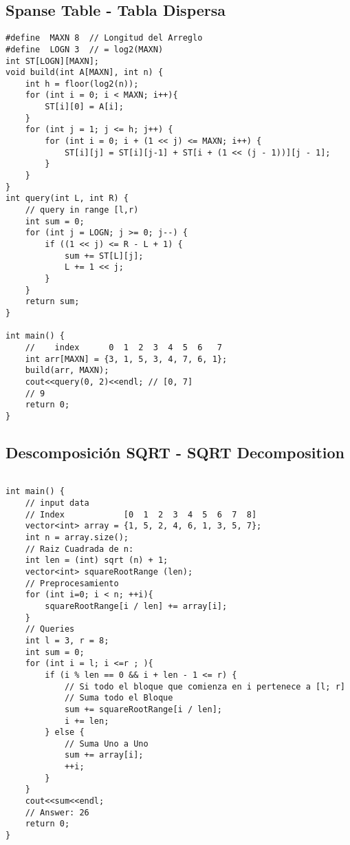 \documentclass[10pt,letterpaper,twocolumn,twosided]{article}
\begin{document}
\subsection{Spanse Table - Tabla Dispersa}
\begin{lstlisting}
#define  MAXN 8  // Longitud del Arreglo
#define  LOGN 3  // = log2(MAXN)
int ST[LOGN][MAXN];
void build(int A[MAXN], int n) {
    int h = floor(log2(n));
    for (int i = 0; i < MAXN; i++){
        ST[i][0] = A[i];
    }
    for (int j = 1; j <= h; j++) {
        for (int i = 0; i + (1 << j) <= MAXN; i++) {
            ST[i][j] = ST[i][j-1] + ST[i + (1 << (j - 1))][j - 1];
        }
    }
}
int query(int L, int R) {
    // query in range [l,r)
    int sum = 0;
    for (int j = LOGN; j >= 0; j--) {
        if ((1 << j) <= R - L + 1) {
            sum += ST[L][j];
            L += 1 << j;
        }
    }
    return sum;
}

int main() {
    //    index      0  1  2  3  4  5  6   7
    int arr[MAXN] = {3, 1, 5, 3, 4, 7, 6, 1};
    build(arr, MAXN);
    cout<<query(0, 2)<<endl; // [0, 7]
    // 9
    return 0;
}
\end{lstlisting}

\subsection{Descomposición SQRT - SQRT Decomposition}
\begin{lstlisting}

int main() {
    // input data
    // Index            [0  1  2  3  4  5  6  7  8]
    vector<int> array = {1, 5, 2, 4, 6, 1, 3, 5, 7};
    int n = array.size();
    // Raiz Cuadrada de n:
    int len = (int) sqrt (n) + 1;
    vector<int> squareRootRange (len);
    // Preprocesamiento
    for (int i=0; i < n; ++i){
        squareRootRange[i / len] += array[i];
    }
    // Queries
    int l = 3, r = 8;
    int sum = 0;
    for (int i = l; i <=r ; ){
        if (i % len == 0 && i + len - 1 <= r) {
            // Si todo el bloque que comienza en i pertenece a [l; r]
            // Suma todo el Bloque
            sum += squareRootRange[i / len];
            i += len;
        } else {
            // Suma Uno a Uno
            sum += array[i];
            ++i;
        }
    }
    cout<<sum<<endl;
    // Answer: 26
    return 0;
}
\end{lstlisting}


\end{document}
